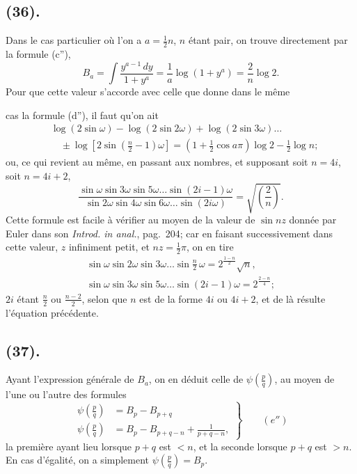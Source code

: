 \documentclass{article}
\begin{document}
\subsection*{(36).}

Dans le cas particulier où l'on a $a=\frac{1}{2}n$, $n$ étant pair, on trouve directement par la formule (c''),
\[ B_{a}=\int\frac{y^{a-1}\,dy}{1+y^{a}}=\frac{1}{a}\log(1+y^{a})=\frac{2}{n}\log 2. \]
Pour que cette valeur s'accorde avec celle que donne dans le même

cas la formule (d''), il faut qu'on ait
\[ \begin{aligned} &\log(2\sin\omega)-\log(2\sin 2\omega)+\log(2\sin 3\omega)\ldots\\ &\quad\pm\log\left[2\sin\left(\frac{n}{2}-1\right)\omega\right]=\left(1+\tfrac{1}{2}\cos a\pi\right)\log 2-\tfrac{1}{2}\log n; \end{aligned} \]
ou, ce qui revient au même, en passant aux nombres, et supposant soit $n=4i$, soit $n=4i+2$,
\[ \frac{\sin\omega\sin 3\omega\sin 5\omega\ldots\sin(2i-1)\omega}{\sin 2\omega\sin 4\omega\sin 6\omega\ldots\sin(2i\omega)}=\sqrt{\left(\frac{2}{n}\right)}. \]
Cette formule est facile à vérifier au moyen de la valeur de $\sin nz$ donnée par Euler dans son \emph{Introd. in anal.}, pag.~204; car en faisant successivement dans cette valeur, $z$ infiniment petit, et $nz=\frac{1}{2}\pi$, on en tire
\[ \begin{gathered} \sin\omega\sin 2\omega\sin 3\omega\ldots\sin\frac{n}{2}\,\omega=2^{\frac{1-n}{2}}\sqrt{n},\\ \sin\omega\sin 3\omega\sin 5\omega\ldots\sin(2i-1)\omega=2^{\frac{2-n}{4}}; \end{gathered} \]
$2i$ étant $\frac{n}{2}$ ou $\frac{n-2}{2}$, selon que $n$ est de la forme $4i$ ou $4i+2$, et de là résulte l'équation précédente.

\subsection*{(37).}

Ayant l'expression générale de $B_{a}$, on en déduit celle de $\psi\left(\frac{p}{q}\right)$, au moyen de l'une ou l'autre des formules
\[ \left.\begin{aligned} \psi\left(\frac{p}{q}\right)&=B_{p}-B_{p+q}\\ \psi\left(\frac{p}{q}\right)&=B_{p}-B_{p+q-n}+\frac{1}{p+q-n}, \end{aligned}\right\}\qquad(e'') \]
la première ayant lieu lorsque $p+q$ est $<n$, et la seconde lorsque $p+q$ est $>n$. En cas d'égalité, on a simplement $\psi\left(\frac{p}{q}\right)=B_{p}$.
\end{document}
